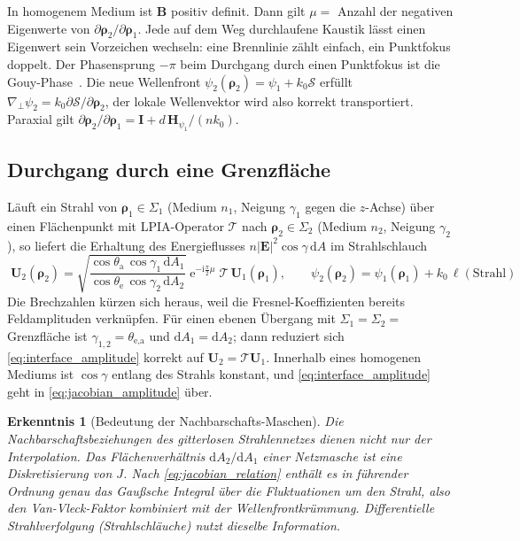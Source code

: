 \documentclass[11pt,a4paper]{scrartcl}
\theoremstyle{insightstyle}
\newtheorem{erkenntnis}{Erkenntnis}
\newcommand{\dd}{\mathrm{d}}
\newcommand{\ii}{\mathrm{i}}
\newcommand{\ee}{\mathrm{e}}
\newcommand{\grad}{\nabla_{\!\perp}}
\newcommand{\Hess}{\bm{H}}
\newcommand{\rh}{\bm{\rho}}
\newcommand{\Sc}{\mathcal{S}}
\begin{document}
In homogenem Medium ist $\bm B$ positiv definit. Dann gilt $\mu=$ Anzahl der negativen Eigenwerte von $\partial\rh_2/\partial\rh_1$. Jede auf dem Weg durchlaufene Kaustik lässt einen Eigenwert sein Vorzeichen wechseln: eine Brennlinie zählt einfach, ein Punktfokus doppelt. Der Phasensprung $-\pi$ beim Durchgang durch einen Punktfokus ist die Gouy-Phase~\cite{baladron2018}. Die neue Wellenfront $\psi_2(\rh_2)=\psi_1+k_0\Sc$ erfüllt $\grad\psi_2=k_0\partial\Sc/\partial\rh_2$, der lokale Wellenvektor wird also korrekt transportiert. Paraxial gilt $\partial\rh_2/\partial\rh_1 = \bm I + d\,\Hess_{\psi_1}/(nk_0)$.

\subsection{Durchgang durch eine Grenzfläche}
Läuft ein Strahl von $\rh_1\in\Sigma_1$ (Medium $n_1$, Neigung $\gamma_1$ gegen die $z$-Achse) über einen Flächenpunkt mit LPIA-Operator $\bm{\mathcal T}$ nach $\rh_2\in\Sigma_2$ (Medium $n_2$, Neigung $\gamma_2$), so liefert die Erhaltung des Energieflusses $n|\bm E|^2\cos\gamma\,\dd A$ im Strahlschlauch
\begin{equation}
    \boxed{\;\bm U_2(\rh_2) = \sqrt{\frac{\cos\theta_\text{a}\,\cos\gamma_1\,\dd A_1}{\cos\theta_\text{e}\,\cos\gamma_2\,\dd A_2}}\;\ee^{-\ii\frac\pi2\mu}\;\bm{\mathcal T}\,\bm U_1(\rh_1),
    \qquad \psi_2(\rh_2)=\psi_1(\rh_1)+k_0\,\ell(\text{Strahl})\;}
    \label{eq:interface_amplitude}
\end{equation}
Die Brechzahlen kürzen sich heraus, weil die Fresnel-Koeffizienten bereits Feldamplituden verknüpfen. Für einen ebenen Übergang mit $\Sigma_1=\Sigma_2=$ Grenzfläche ist $\gamma_{1,2}=\theta_\text{e,a}$ und $\dd A_1=\dd A_2$; dann reduziert sich \eqref{eq:interface_amplitude} korrekt auf $\bm U_2=\bm{\mathcal T}\bm U_1$. Innerhalb eines homogenen Mediums ist $\cos\gamma$ entlang des Strahls konstant, und \eqref{eq:interface_amplitude} geht in \eqref{eq:jacobian_amplitude} über.

\begin{erkenntnis}[Bedeutung der Nachbarschafts-Maschen]
Die Nachbarschaftsbeziehungen des gitterlosen Strahlennetzes dienen nicht nur der Interpolation. Das Flächenverhältnis $\dd A_2/\dd A_1$ einer Netzmasche ist eine Diskretisierung von $J$. Nach \eqref{eq:jacobian_relation} enthält es in führender Ordnung genau das Gaußsche Integral über die Fluktuationen um den Strahl, also den Van-Vleck-Faktor kombiniert mit der Wellenfrontkrümmung. Differentielle Strahlverfolgung (Strahlschläuche) nutzt dieselbe Information.
\end{erkenntnis}
\end{document}
